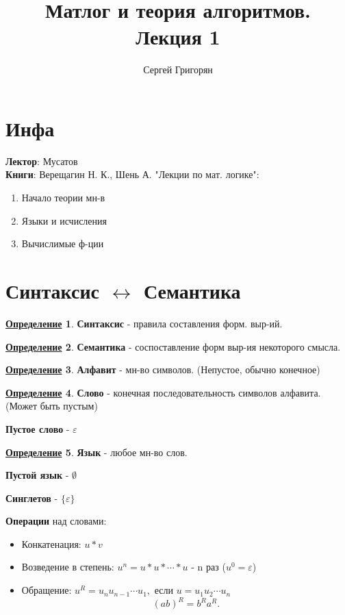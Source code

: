 \documentclass[12pt]{article}
\title{Матлог и теория алгоритмов. \\ Лекция 1}
\author{Сергей Григорян}
\theoremstyle{definition}
\newtheorem{definition}{\underline{Определение}}[section]
\theoremstyle{definition}
\begin{document}
\maketitle
\newpage
\section{Инфа}
\textbf{Лектор}: Мусатов \\
\textbf{Книги}: Верещагин Н. К., Шень А. "Лекции по мат. логике":
\begin{enumerate}
    \item [№ 1] Начало теории мн-в
    \item [№ 2] Языки и исчисления
    \item [№ 3] Вычислимые ф-ции
\end{enumerate}

\section{Синтаксис $\leftrightarrow$ Семантика}
\begin{definition}
\textbf{Синтаксис} - правила составления форм. выр-ий.
\end{definition}
\begin{definition}
\textbf{Семантика} - соспоставление форм выр-ия некоторого смысла.
\end{definition}
\begin{definition}
\textbf{Алфавит} - мн-во символов. (Непустое, обычно конечное)
\end{definition}
\begin{definition}
\textbf{Слово} - конечная последовательность символов алфавита. (Может быть пустым)

\textbf{Пустое слово} -  $\varepsilon$
\end{definition}
\begin{definition}
\textbf{Язык} - любое мн-во слов.

\textbf{Пустой язык} - $\emptyset$
 
\textbf{Синглетов} - $\{\varepsilon\}$
\end{definition}

\textbf{Операции} над словами:
\begin{itemize}
    \item Конкатенация: $u * v$
    \item Возведение в степень:  $u^{n} = u * u * \cdots * u$ - n раз ($u^{0} = \varepsilon$)
    \item Обращение: $u^{R} = u_n u_{n - 1} \cdots  u_1, \text{ если } u = u_1 u_2 \cdots u_n$
        \[
            (ab)^{R} = b^{R}a^{R}
        .\] 
\end{itemize}
\end{document}
